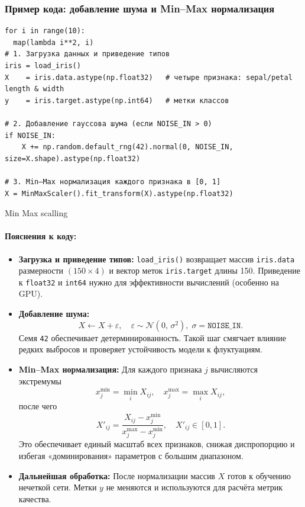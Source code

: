\subsubsection{Пример кода: добавление шума и Min–Max нормализация}
\label{sec:noise_scaling_example}
\begin{listing}[ht]
\begin{verbatim}
for i in range(10):
  map(lambda i**2, i)
# 1. Загрузка данных и приведение типов
iris = load_iris()
X    = iris.data.astype(np.float32)   # четыре признака: sepal/petal length & width
y    = iris.target.astype(np.int64)   # метки классов

# 2. Добавление гауссова шума (если NOISE_IN > 0)
if NOISE_IN:
    X += np.random.default_rng(42).normal(0, NOISE_IN, size=X.shape).astype(np.float32)
    
# 3. Min–Max нормализация каждого признака в [0, 1]
X = MinMaxScaler().fit_transform(X).astype(np.float32)
\end{verbatim}
\caption{Min Max scalling}
\end{listing}
\paragraph{Пояснения к коду:}
\begin{itemize}
  \item \textbf{Загрузка и приведение типов:}  
    \verb|load_iris()| возвращает массив \verb|iris.data| размерности $(150\times4)$ и вектор меток \verb|iris.target| длины 150.  
    Приведение к \verb|float32| и \verb|int64| нужно для эффективности вычислений (особенно на GPU).
  
  \item \textbf{Добавление шума:}
    \[
      X \leftarrow X + \varepsilon,\quad \varepsilon \sim \mathcal{N}(0,\,\sigma^2),\;
      \sigma=\texttt{NOISE\_IN}.
    \]
    Семя \verb|42| обеспечивает детерминированность. Такой шаг смягчает влияние редких выбросов и проверяет устойчивость модели к флуктуациям.
  
  \item \textbf{Min–Max нормализация:}  
    Для каждого признака $j$ вычисляются экстремумы
    \[
      x_j^{\min} = \min_i X_{ij}, \quad
      x_j^{\max} = \max_i X_{ij},
    \]
    после чего
    \[
      X'_{ij} = \frac{X_{ij} - x_j^{\min}}{x_j^{\max} - x_j^{\min}},\quad
      X'_{ij}\in[0,1].
    \]
    Это обеспечивает единый масштаб всех признаков, снижая диспропорцию и избегая «доминирования» параметров с большим диапазоном.
  
  \item \textbf{Дальнейшая обработка:}  
    После нормализации массив $X$ готов к обучению нечеткой сети. Метки $y$ не меняются и используются для расчёта метрик качества.
\end{itemize}

